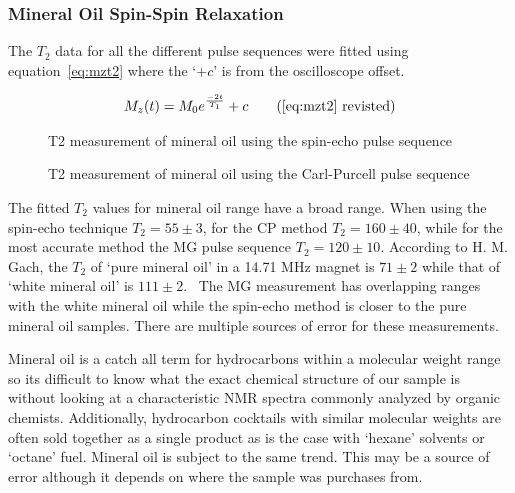 \documentclass[
reprint,
amsmath,amssymb,
aps,
tikz,
border=5pt
]{revtex4-1}
\newcommand*{\tc}[1][1]{$T_#1$ }
\begin{document}
\subsubsection*{Mineral Oil Spin-Spin Relaxation}

    
    The \tc[2] data for all the different pulse sequences were fitted using equation~\ref{eq:mzt2} where the `$+c$' is from the oscilloscope offset.
    
    \begin{gather*}
        M_z(t) = M_0  e^\frac{-2t}{T_1} + c \tag{\ref{eq:mzt2} revisted}
    \end{gather*}


    \begin{figure}[t]
        \resizebox{0.45\textwidth}{!}{}
        \caption{T2 measurement of mineral oil using the spin-echo pulse sequence }
        \label{fig:mo_se}
    \end{figure}

    \begin{figure}[b]
        \resizebox{0.45\textwidth}{!}{}
        \caption{T2 measurement of mineral oil using the Carl-Purcell pulse sequence }
        \label{fig:mo_cp}
    \end{figure}
    
    The fitted \tc[2] values for mineral oil range have a broad range. When using the spin-echo technique $T_2 = 55 \pm 3$, for the CP method $T_2 = 160 \pm 40 $, while for the most accurate method the MG pulse sequence $T_2 = 120 \pm 10 $. According to H. M. Gach, the \tc[2] of `pure mineral oil' in a 14.71 MHz magnet is $71 \pm 2$ while that of `white mineral oil' is $111 \pm 2 $.~\cite{medphys} The MG measurement has overlapping ranges with the white mineral oil while the spin-echo method is closer to the pure mineral oil samples. There are multiple sources of error for these measurements.
    



    Mineral oil is a catch all term for hydrocarbons within a molecular weight range so its difficult to know what the exact chemical structure of our sample is without looking at a characteristic NMR spectra commonly analyzed by organic chemists. Additionally, hydrocarbon cocktails with similar molecular weights are often sold together as a single product as is the case with `hexane' solvents or `octane' fuel. Mineral oil is subject to the same trend. This may be a source of error although it depends on where the sample was purchases from.
\end{document}
